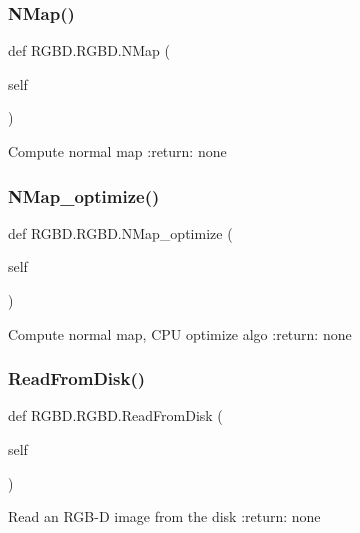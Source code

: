 \subsubsection{\texorpdfstring{N\+Map()}{NMap()}}
{\footnotesize\ttfamily def R\+G\+B\+D.\+R\+G\+B\+D.\+N\+Map (\begin{DoxyParamCaption}\item[{}]{self }\end{DoxyParamCaption})}

\begin{DoxyVerb}Compute normal map
:return: none
\end{DoxyVerb}
 \mbox{\label{class_r_g_b_d_1_1_r_g_b_d_ae269b01a123ea0c10cd0317b510e7ef9}} 
\subsubsection{\texorpdfstring{N\+Map\+\_\+optimize()}{NMap\_optimize()}}
{\footnotesize\ttfamily def R\+G\+B\+D.\+R\+G\+B\+D.\+N\+Map\+\_\+optimize (\begin{DoxyParamCaption}\item[{}]{self }\end{DoxyParamCaption})}

\begin{DoxyVerb}Compute normal map, CPU optimize algo
:return: none
\end{DoxyVerb}
 \mbox{\label{class_r_g_b_d_1_1_r_g_b_d_a65ca0d3759c2b9977b24c952b9057ac9}} 
\subsubsection{\texorpdfstring{Read\+From\+Disk()}{ReadFromDisk()}}
{\footnotesize\ttfamily def R\+G\+B\+D.\+R\+G\+B\+D.\+Read\+From\+Disk (\begin{DoxyParamCaption}\item[{}]{self }\end{DoxyParamCaption})}

\begin{DoxyVerb}Read an RGB-D image from the disk
:return: none
\end{DoxyVerb}
 \mbox{\label{class_r_g_b_d_1_1_r_g_b_d_ac7350dc76ae47fdd77c0ad93a74910db}} 
